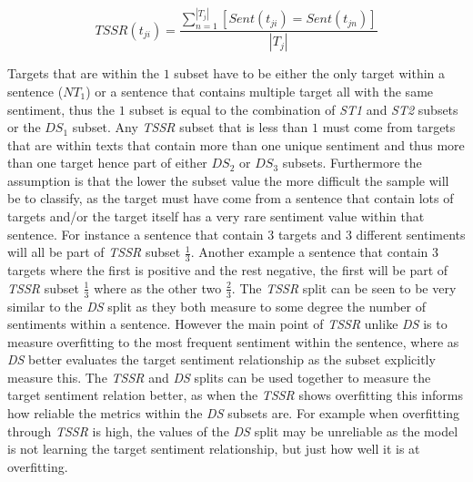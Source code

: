 \begin{equation}
TSSR(t_{ji}) = \frac{\sum_{n=1}^{|T_j|} [Sent(t_{ji})=Sent(t_{jn})]}{|T_j|}
\label{eq:aug_tssr}
\end{equation}

Targets that are within the $1$ subset have to be either the only target within a sentence ($NT_1$) or a sentence that contains multiple target all with the same sentiment, thus the $1$ subset is equal to the combination of \textit{ST1} and \textit{ST2} subsets or the $DS_1$ subset. Any \textit{TSSR} subset that is less than $1$ must come from targets that are within texts that contain more than one unique sentiment and thus more than one target hence part of either $DS_2$ or $DS_3$ subsets. Furthermore the assumption is that the lower the subset value the more difficult the sample will be to classify, as the target must have come from a sentence that contain lots of targets and/or the target itself has a very rare sentiment value within that sentence. For instance a sentence that contain 3 targets and 3 different sentiments will all be part of \textit{TSSR} subset $\frac{1}{3}$. Another example a sentence that contain 3 targets where the first is positive and the rest negative, the first will be part of \textit{TSSR} subset $\frac{1}{3}$ where as the other two $\frac{2}{3}$. The \textit{TSSR} split can be seen to be very similar to the \textit{DS} split as they both measure to some degree the number of sentiments within a sentence. However the main point of \textit{TSSR} unlike \textit{DS} is to measure overfitting to the most frequent sentiment within the sentence, where as \textit{DS} better evaluates the target sentiment relationship as the subset explicitly measure this. The \textit{TSSR} and \textit{DS} splits can be used together to measure the target sentiment relation better, as when the \textit{TSSR} shows overfitting this informs how reliable the metrics within the \textit{DS} subsets are. For example when overfitting through \textit{TSSR} is high, the values of the \textit{DS} split may be unreliable as the model is not learning the target sentiment relationship, but just how well it is at overfitting.

